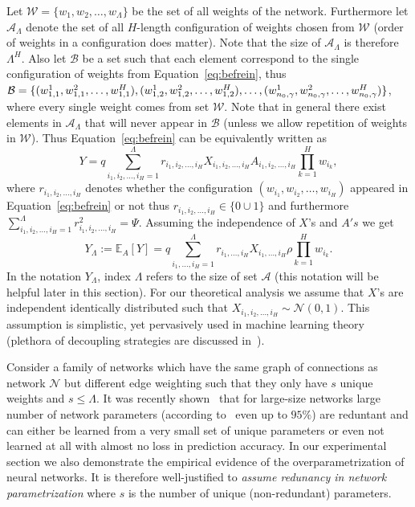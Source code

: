 \documentclass[twoside]{article}
\begin{document}
Let $\mathcal{W} = \{w_1,w_2,\dots,w_{\Lambda}\}$ be the set of all weights of the network. Furthermore let $\mathcal{A}_{\Lambda}$ denote the set of all $H$-length configuration of weights chosen from $\mathcal{W}$ (order of weights in a configuration does matter). Note that the size of $\mathcal{A}_{\Lambda}$ is therefore $\Lambda^H$. Also let $\mathcal{B}$ be a set such that each element correspond to the single configuration of weights from Equation~\ref{eq:befrein}, thus $\mathcal{B} = \{(w_{1,1}^1,w_{1,1}^2,\dots,w_{1,1}^H),(w_{1,2}^1,w_{1,2}^2,\dots,w_{1,2}^H),\dots,\\(w_{n_0,\gamma}^1,w_{n_0,\gamma}^2,\dots,w_{n_0,\gamma}^H)\}$, where every single weight comes from set $\mathcal{W}$. Note that in general there exist elements in $\mathcal{A}_{\Lambda}$ that will never appear in $\mathcal{B}$ (unless we allow repetition of weights in $\mathcal{W}$). Thus Equation~\ref{eq:befrein} can be equivalently written as 
\[Y = q\!\!\!\!\sum_{i_1,i_2,\dots,i_H=1}^{\Lambda}\!\!\!r_{i_1,i_2,\dots,i_H}X_{i_1,i_2,\dots,i_H}A_{i_1,i_2,\dots,i_H}\prod_{k = 1}^{H}w_{i_k},
\]
where $r_{i_1,i_2,\dots,i_H}$ denotes whether the configuration $(w_{i_1},w_{i_2},\dots,w_{i_H})$ appeared in Equation~\ref{eq:befrein} or not thus $r_{i_1,i_2,\dots,i_H} \in \{0\cup{1}\}$ and furthermore $\sum_{i_1,i_2,\dots,i_H=1}^{\Lambda}r_{i_1,i_2,\dots,i_H}^2 = \Psi$. Assuming the independence of $X$'s and $A's$ we get
\begin{equation}
Y_{\Lambda} := \mathbb{E}_A[Y] = q\!\!\!\sum_{i_1,\dots,i_H=1}^{\Lambda}\!\!\!r_{i_1,\dots,i_H}X_{i_1,\dots,i_H}\rho\prod_{k = 1}^{H}\!\!w_{i_k}.
\label{eq:befapprox}
\end{equation}
In the notation $Y_{\Lambda}$, index $\Lambda$ refers to the size of set $\mathcal{A}$ (this notation will be helpful later in this section). For our theoretical analysis we assume that $X$'s are independent identically distributed such that $X_{i_1,i_2,\dots,i_H}\sim\mathcal{N}(0,1)$. This assumption is simplistic, yet pervasively used in machine learning theory (plethora of decoupling strategies are discussed in~\cite{opac-b1095246}). 

Consider a family of networks which have the same graph of connections as network $\mathcal{N}$ but different edge weighting such that they only have $s$ unique weights and $s \leq \Lambda$. It was recently shown~\cite{NIPS2013_5025,DBLP:journals/corr/DentonZBLF14} that for large-size networks large number of network parameters (according to~\cite{NIPS2013_5025} even up to $95\%$) are reduntant and can either be learned from a very small set of unique parameters or even not learned at all with almost no loss in prediction accuracy.  In our experimental section we also demonstrate the empirical evidence of the overparametrization of neural networks. It is therefore well-justified to \textit{assume redunancy in network parametrization} where $s$ is the number of unique (non-redundant) parameters.
\end{document}
